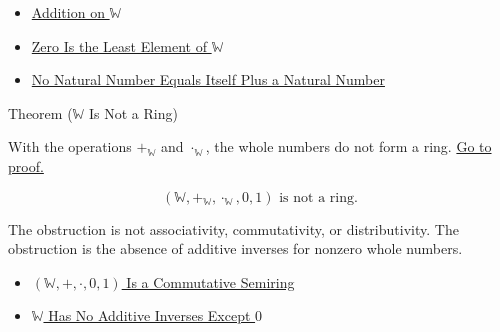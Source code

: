\begin{dependencies}
\begin{itemize}
  \item \hyperref[def:addition-on-w]{Addition on $\mathbb{W}$}
  \item \hyperref[thm:zero-least-element-of-w]{Zero Is the Least Element of $\mathbb{W}$}
  \item \hyperref[thm:no-natural-number-equals-itself-plus-a-natural-number]{No Natural Number Equals Itself Plus a Natural Number}
\end{itemize}
\end{dependencies}

\begin{theorembox}{Theorem (\texorpdfstring{$\mathbb{W}$}{W} Is Not a Ring)}
\begin{theorem}
\label{thm:w-is-not-a-ring}
With the operations $+_{\mathbb{W}}$ and $\cdot_{\mathbb{W}}$, the whole
numbers do not form a ring.
\hyperref[prf:w-is-not-a-ring]{Go to proof.}
\end{theorem}
\end{theorembox}

\begin{remark*}
\[
(\mathbb{W},+_{\mathbb{W}},\cdot_{\mathbb{W}},0,1)
\text{ is not a ring}.
\]
\end{remark*}

\begin{remark*}[Interpretation]
The obstruction is not associativity, commutativity, or distributivity. The
obstruction is the absence of additive inverses for nonzero whole numbers.
\end{remark*}

\begin{dependencies}
\begin{itemize}
  \item \hyperref[thm:w-commutative-semiring]{$(\mathbb{W},+,\cdot,0,1)$ Is a Commutative Semiring}
  \item \hyperref[thm:w-has-no-additive-inverses-except-zero]{$\mathbb{W}$ Has No Additive Inverses Except $0$}
\end{itemize}
\end{dependencies}
